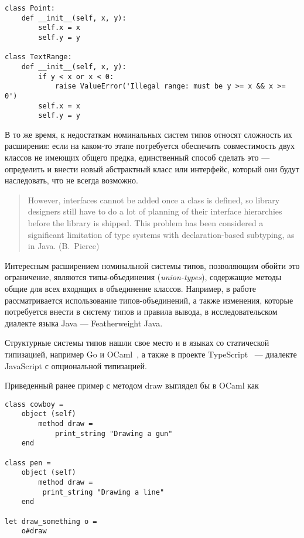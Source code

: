 \begin{lstlisting}
class Point:
    def __init__(self, x, y):
        self.x = x
        self.y = y

class TextRange:
    def __init__(self, x, y):
        if y < x or x < 0:
            raise ValueError('Illegal range: must be y >= x && x >= 0')
        self.x = x
        self.y = y
\end{lstlisting}

В то же время, к недостаткам номинальных систем типов относят сложность их
расширения: если на каком-то этапе потребуется обеспечить совместимость двух
классов не имеющих общего предка, единственный способ сделать это --- определить
и внести новый абстрактный класс или интерфейс, который они будут наследовать,
что не всегда возможно.  

\begin{quote}
However, interfaces cannot be added once a class is defined, so library
designers still have to do a lot of planning of their interface hierarchies
before the library is shipped. This problem has been considered a significant
limitation of type systems with declaration-based subtyping, as in Java.
(B.~Pierce)
\end{quote}

Интересным расширением номинальной системы типов, позволяющим обойти это
ограничение, являются типы-объединения (\emph{union-types}), содержащие методы
общие для всех входящих в объединение классов. Например, в
работе~\cite{Igarashi2006} рассматривается использование типов-объединений, а
также изменения, которые потребуется внести в систему типов и правила вывода, в
исследовательском диалекте языка Java --- Featherweight Java.

Структурные системы типов нашли свое место и в языках со статической
типизацией, например Go и OCaml~\cite[с.~33]{Ocaml}, а также в проекте
TypeScript~\cite[]{TypeScript} --- диалекте JavaScript с опциональной
типизацией. 

Приведенный ранее пример с методом draw выглядел бы в OCaml как

\lstset{language=[Objective]Caml}
\begin{lstlisting}
class cowboy =
    object (self)
        method draw =
            print_string "Drawing a gun"
    end

class pen = 
    object (self) 
        method draw =
         print_string "Drawing a line"
    end

let draw_something o =
    o#draw

\end{lstlisting}

